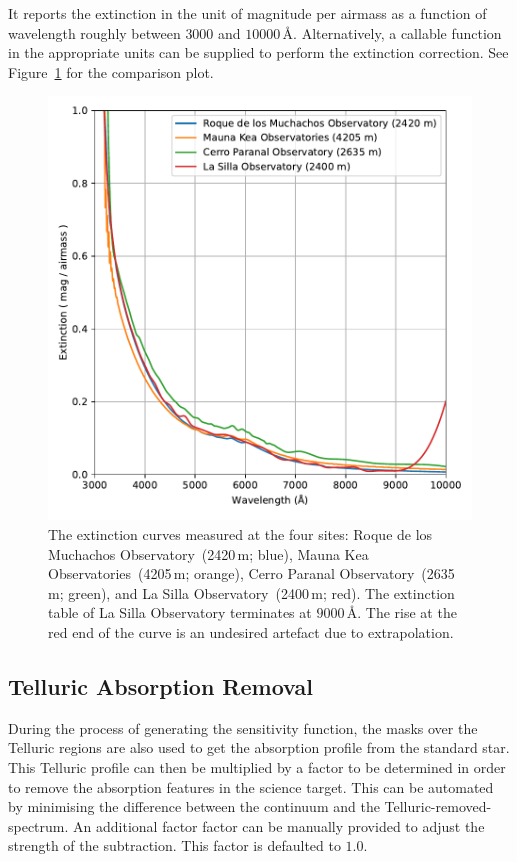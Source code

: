\documentclass[fleqn,usenatbib]{mnras}
\begin{document}
It reports the extinction in the unit of magnitude per airmass as a
function of wavelength roughly between $3000$ and $10000$\,\AA.
Alternatively, a callable function in the appropriate units can be
supplied to perform the extinction correction. See Figure~\ref{fig:extinction}
for the comparison plot.

\begin{figure}
    \centering
    \includegraphics[width=\columnwidth]{fig_07_extinction_curves.pdf}
    \caption{The extinction curves measured at the four sites: Roque de los Muchachos
    Observatory~(2420\,m; blue), Mauna Kea Observatories~(4205\,m; orange),
    Cerro Paranal Observatory~(2635\,m; green), and La Silla Observatory~(2400\,m; red).
    The extinction table of La Silla Observatory terminates at $9000$\,\AA. The rise at
    the red end of the curve is an undesired artefact due to extrapolation.}
    \label{fig:extinction}
\end{figure}

\subsection*{Telluric Absorption Removal}
During the process of generating the sensitivity function, the masks
over the Telluric regions are also used to get the absorption profile
from the standard star. This Telluric profile can then be multiplied
by a factor to be determined in order to remove the absorption features
in the science target. This can be automated by minimising the difference
between the continuum and the Telluric-removed-spectrum. An additional
factor factor can be manually provided to adjust the strength of the
subtraction. This factor is defaulted to $1.0$.
\end{document}
